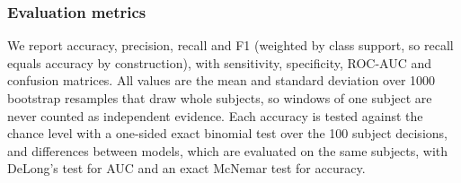 \subsubsection{Evaluation metrics}
We report accuracy, precision, recall and F1 (weighted by class support, so
recall equals accuracy by construction), with sensitivity, specificity, ROC-AUC
and confusion matrices. All values are the mean and standard deviation over
1000 bootstrap resamples that draw whole subjects, so windows of one subject
are never counted as independent evidence. Each accuracy is tested against the
chance level with a one-sided exact binomial test over the 100 subject
decisions, and differences between models, which are evaluated on the same
subjects, with DeLong's test for AUC and an exact McNemar test for accuracy.
